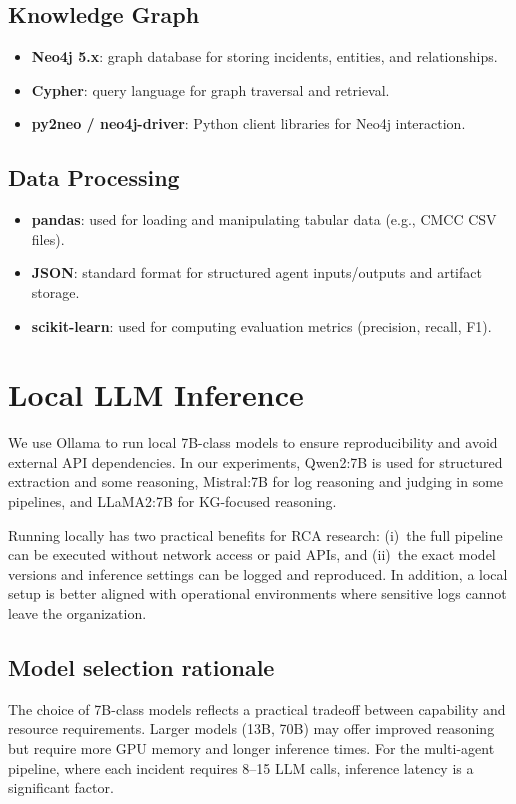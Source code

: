 \subsection{Knowledge Graph}
\begin{itemize}
  \item \textbf{Neo4j 5.x}: graph database for storing incidents, entities, and relationships.
  \item \textbf{Cypher}: query language for graph traversal and retrieval.
  \item \textbf{py2neo / neo4j-driver}: Python client libraries for Neo4j interaction.
\end{itemize}

\subsection{Data Processing}
\begin{itemize}
  \item \textbf{pandas}: used for loading and manipulating tabular data (e.g., CMCC CSV files).
  \item \textbf{JSON}: standard format for structured agent inputs/outputs and artifact storage.
  \item \textbf{scikit-learn}: used for computing evaluation metrics (precision, recall, F1).
\end{itemize}

\section{Local LLM Inference}
We use Ollama to run local 7B-class models to ensure reproducibility and avoid external API
dependencies. In our experiments, Qwen2:7B is used for structured extraction and some reasoning,
Mistral:7B for log reasoning and judging in some pipelines, and LLaMA2:7B for KG-focused
reasoning.

Running locally has two practical benefits for RCA research: (i)~the full pipeline can be
executed without network access or paid APIs, and (ii)~the exact model versions and inference
settings can be logged and reproduced. In addition, a local setup is better aligned with
operational environments where sensitive logs cannot leave the organization.

\subsection{Model selection rationale}
The choice of 7B-class models reflects a practical tradeoff between capability and resource
requirements. Larger models (13B, 70B) may offer improved reasoning but require more GPU memory
and longer inference times. For the multi-agent pipeline, where each incident requires 8--15 LLM
calls, inference latency is a significant factor.

